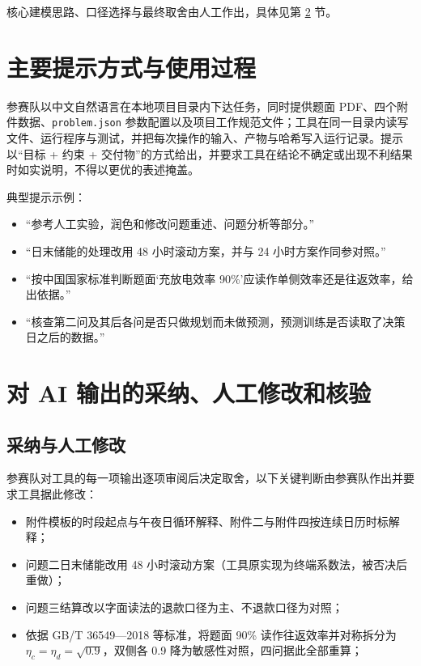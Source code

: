 \documentclass[UTF8,zihao=-4]{ctexart}
\begin{document}
\noindent 核心建模思路、口径选择与最终取舍由人工作出，具体见第 \ref{sec:adopt} 节。

\section{主要提示方式与使用过程}

参赛队以中文自然语言在本地项目目录内下达任务，同时提供题面 PDF、四个附件数据、\texttt{problem.json} 参数配置以及项目工作规范文件；工具在同一目录内读写文件、运行程序与测试，并把每次操作的输入、产物与哈希写入运行记录。提示以“目标 + 约束 + 交付物”的方式给出，并要求工具在结论不确定或出现不利结果时如实说明，不得以更优的表述掩盖。

典型提示示例：

\begin{itemize}
\item “参考人工实验，润色和修改问题重述、问题分析等部分。”
\item “日末储能的处理改用 48 小时滚动方案，并与 24 小时方案作同参对照。”
\item “按中国国家标准判断题面‘充放电效率 90\%’应读作单侧效率还是往返效率，给出依据。”
\item “核查第二问及其后各问是否只做规划而未做预测，预测训练是否读取了决策日之后的数据。”
\end{itemize}

\section{对 AI 输出的采纳、人工修改和核验}\label{sec:adopt}

\subsection*{采纳与人工修改}

参赛队对工具的每一项输出逐项审阅后决定取舍，以下关键判断由参赛队作出并要求工具据此修改：

\begin{itemize}
\item 附件模板的时段起点与午夜日循环解释、附件二与附件四按连续日历时标解释；
\item 问题二日末储能改用 48 小时滚动方案（工具原实现为终端系数法，被否决后重做）；
\item 问题三结算改以字面读法的退款口径为主、不退款口径为对照；
\item 依据 GB/T 36549—2018 等标准，将题面 90\% 读作往返效率并对称拆分为 $\eta_c=\eta_d=\sqrt{0.9}$，双侧各 0.9 降为敏感性对照，四问据此全部重算；
\end{itemize}
\end{document}
